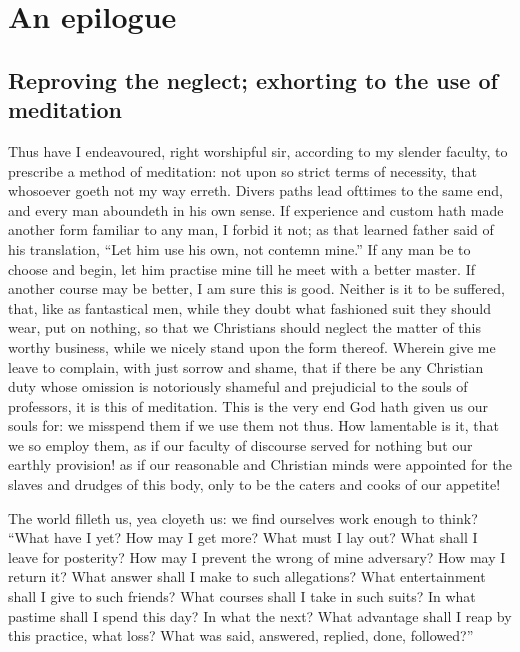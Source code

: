 \chapter{An epilogue}
\section{Reproving the neglect; exhorting to the use of meditation}
Thus have I endeavoured, right worshipful sir, according to my slender faculty, to prescribe a method of meditation: not upon so strict terms of necessity, that whosoever goeth not my way erreth. Divers paths lead ofttimes to the same end, and every man aboundeth in his own sense. If experience and custom hath made another form familiar to any man, I forbid it not; as that learned father said of his translation, ``Let him use his own, not contemn mine.'' If any man be to choose and begin, let him practise mine till he meet with a better master. If another course may be better, I am sure this is good. Neither is it to be suffered, that, like as fantastical men, while they doubt what fashioned suit they should wear, put on nothing, so that we Christians should neglect the matter of this worthy business, while we nicely stand upon the form thereof. Wherein give me leave to complain, with just sorrow and shame, that if there be any Christian duty whose omission is notoriously shameful and prejudicial to the souls of professors, it is this of meditation. This is the very end God hath given us our souls for: we misspend them if we use them not thus. How lamentable is it, that we so employ them, as if our faculty of discourse served for nothing but our earthly provision! as if our reasonable and Christian minds were appointed for the slaves and drudges of this body, only to be the caters and cooks of our appetite! 

The world filleth us, yea cloyeth us: we find ourselves work enough to think? ``What have I yet? How may I get more? What must I lay out? What shall I leave for posterity? How 
may I prevent the wrong of mine adversary? How may I return it? What answer shall I make to such allegations? What entertainment shall I give to such friends? What courses shall I take in such suits? In what pastime shall I spend this day? In what the next? What advantage shall I reap by this practice, what loss? What was said, answered, replied, done, followed?''

